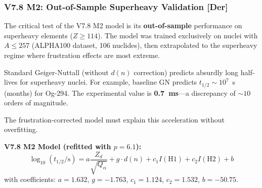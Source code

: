 \subsubsection{V7.8 M2: Out-of-Sample Superheavy Validation [Der]}
\label{subsubsec:v78-superheavy-oos}

The critical test of the V7.8 M2 model is its \textbf{out-of-sample} performance on superheavy elements ($Z \geq 114$). The model was trained exclusively on nuclei with $A \leq 257$ (ALPHA100 dataset, 106 nuclides), then extrapolated to the superheavy regime where frustration effects are most extreme.

\begin{tcolorbox}[colback=red!5!white, colframe=red!75!black, title=Why Superheavy is the Decisive Test]
Standard Geiger-Nuttall (without $d(n)$ correction) predicts absurdly long half-lives for superheavy nuclei. For example, baseline GN predicts $t_{1/2} \sim 10^7$~s (months) for Og-294. The experimental value is \textbf{0.7~ms}---a discrepancy of $\sim 10$ orders of magnitude.

The frustration-corrected model must explain this acceleration without overfitting.
\end{tcolorbox}

\textbf{V7.8 M2 Model (refitted with $p = 6.1$):}
\begin{equation}
    \log_{10}(t_{1/2}/\text{s}) = a \frac{Z_d}{\sqrt{Q_\alpha}} + g \cdot d(n) + c_1 I(\text{H1}) + c_2 I(\text{H2}) + b
\end{equation}
with coefficients: $a = 1.632$, $g = -1.763$, $c_1 = 1.124$, $c_2 = 1.532$, $b = -50.75$.

